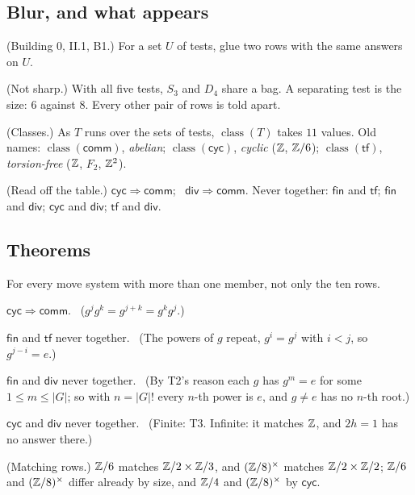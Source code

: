 \subsection*{Blur, and what appears}

\begin{lines}
\item[\lab{B1}] (Building 0, II.1, B1.) For a set $U$ of tests, glue two rows with the same answers on $U$.
\item[\lab{P1}] (Not sharp.) With all five tests, $S_3$ and $D_4$ share a bag. A separating test is the size: $6$ against $8$. Every other pair of rows is told apart.
\item[\lab{P2}] (Classes.) As $T$ runs over the sets of tests, $\operatorname{class}(T)$ takes $11$ values. Old names: $\operatorname{class}(\mathsf{comm})$, \emph{abelian}; $\operatorname{class}(\mathsf{cyc})$, \emph{cyclic} ($\mathbb{Z}$, $\mathbb{Z}/6$); $\operatorname{class}(\mathsf{tf})$, \emph{torsion-free} ($\mathbb{Z}$, $F_2$, $\mathbb{Z}^2$).
\item[\lab{P3}] (Read off the table.) $\mathsf{cyc} \Rightarrow \mathsf{comm}$; \ $\mathsf{div} \Rightarrow \mathsf{comm}$. Never together: $\mathsf{fin}$ and $\mathsf{tf}$; $\mathsf{fin}$ and $\mathsf{div}$; $\mathsf{cyc}$ and $\mathsf{div}$; $\mathsf{tf}$ and $\mathsf{div}$.
\end{lines}

\subsection*{Theorems}

For every move system with more than one member, not only the ten rows.
\begin{lines}
\item[\lab{T1}] $\mathsf{cyc} \Rightarrow \mathsf{comm}$. \ ($g^j g^k = g^{j+k} = g^k g^j$.)
\item[\lab{T2}] $\mathsf{fin}$ and $\mathsf{tf}$ never together. \ (The powers of $g$ repeat, $g^i = g^j$ with $i < j$, so $g^{j-i} = e$.)
\item[\lab{T3}] $\mathsf{fin}$ and $\mathsf{div}$ never together. \ (By T2's reason each $g$ has $g^m = e$ for some $1 \le m \le |G|$; so with $n = |G|!$ every $n$-th power is $e$, and $g \ne e$ has no $n$-th root.)
\item[\lab{T4}] $\mathsf{cyc}$ and $\mathsf{div}$ never together. \ (Finite: T3. Infinite: it matches $\mathbb{Z}$, and $2h = 1$ has no answer there.)
\item[\lab{T5}] (Matching rows.) $\mathbb{Z}/6$ matches $\mathbb{Z}/2 \times \mathbb{Z}/3$, and $(\mathbb{Z}/8)^\times$ matches $\mathbb{Z}/2 \times \mathbb{Z}/2$; $\mathbb{Z}/6$ and $(\mathbb{Z}/8)^\times$ differ already by size, and $\mathbb{Z}/4$ and $(\mathbb{Z}/8)^\times$ by $\mathsf{cyc}$.
\end{lines}

